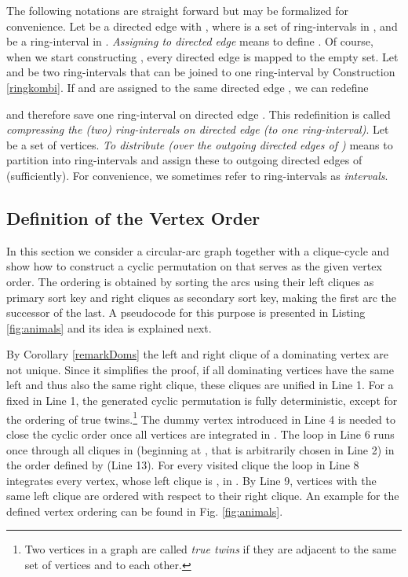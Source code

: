 \documentclass[10pt]{article}
\begin{document}
The following notations are straight forward but may be formalized for convenience.
Let  be a directed edge with , where  is a set of ring-intervals 
in , and  be a ring-interval in . \emph{Assigning  to directed edge } 
means to define .
Of course, when we start constructing , every directed edge is mapped to the empty set.
Let  and  be two ring-intervals that can be joined to one 
ring-interval  by Construction \ref{ringkombi}. If  and 
 are assigned to the same directed edge , we can redefine

and therefore save one ring-interval on directed edge .
This redefinition is called \emph{compressing the (two) ring-intervals on directed edge  
(to one ring-interval)}. Let  be a set of vertices. \emph{To distribute  (over the outgoing directed edges of )} means to partition 
 into ring-intervals and assign these to outgoing directed edges of  (sufficiently).
For convenience,
we sometimes refer to ring-intervals as \emph{intervals}.




\subsection{Definition of the Vertex Order}\label{constrCO}





In this section we consider a circular-arc graph  
together with a clique-cycle  and show
how to construct a cyclic permutation  on  
that serves as the given vertex order. The ordering is obtained by
sorting the arcs using their left cliques as primary sort key
and right cliques as secondary sort key, making the first
arc the successor of the last. A pseudocode for this 
purpose is presented in Listing \ref{fig:animals} and its idea is explained 
next.


By Corollary \ref{remarkDoms} the left and right clique of a dominating vertex are not unique.
Since it simplifies the proof, if all dominating vertices have the same left and thus also 
the same right clique, these cliques are unified in Line 1.
For a fixed  in Line 1, the generated cyclic permutation is fully deterministic, 
except for the ordering of true twins.\footnote{Two vertices in a graph are called 
\emph{true twins} if they are adjacent to the same set of vertices and to each other.}
The dummy vertex introduced in Line 4 is needed to close the cyclic order once all vertices 
are integrated in .
The loop in Line 6 runs once through all cliques in  (beginning at , that 
is arbitrarily chosen in Line 2) in the order defined by  (Line 13).
For every visited clique  the loop in Line 8 integrates every vertex, whose left 
clique is , in .
By Line 9, vertices with the same left clique are ordered with respect to 
their right clique. An example for the defined vertex ordering can be found in 
Fig. \ref{fig:animals}.
\end{document}
